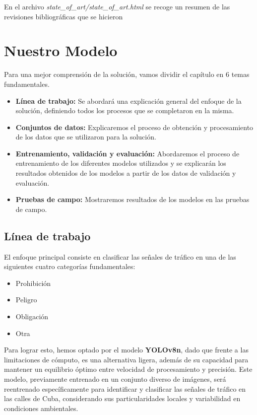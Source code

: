 \documentclass{article}
\begin{document}
\begin{tcolorbox}
En el archivo \textit{state\_of\_art/state\_of\_art.html} se recoge un resumen de las revisiones bibliográficas que se hicieron
\end{tcolorbox}



\section{Nuestro Modelo}
Para una mejor comprensión de la solución, vamos dividir el capítulo en 6 temas fundamentales.\\
\begin{itemize}
\item{\textbf{Línea de trabajo:} Se abordará una explicación general del enfoque de la solución, definiendo todos los procesos que se completaron en la misma.}
\item{\textbf{Conjuntos de datos:} Explicaremos el proceso de obtención y procesamiento de los datos que se utilizaron para la solución.}
\item{\textbf{Entrenamiento, validación y evaluación:} Abordaremos el proceso de entrenamiento de los diferentes modelos utilizados y se explicarán los resultados obtenidos de los modelos a partir de los datos de validación y evaluación.}
\item{\textbf{Pruebas de campo:} Mostraremos resultados de los modelos en las pruebas de campo.}
\end{itemize}
\subsection{Línea de trabajo}
El enfoque principal consiste en clasificar las señales de tráfico en una de las siguientes cuatro categorías fundamentales: 
\begin{itemize}
\item{Prohibición}
\item{Peligro}
\item{Obligación}
\item{Otra}
\end{itemize}
Para lograr esto, hemos optado por el modelo \textbf{YOLOv8n}, dado que frente a las limitaciones de cómputo, es una alternativa ligera, además de su capacidad para mantener un equilibrio óptimo entre velocidad de procesamiento y precisión. Este modelo, previamente entrenado en un conjunto diverso de imágenes, será reentrenado específicamente para identificar y clasificar las señales de tráfico en las calles de Cuba, considerando sus particularidades locales y variabilidad en condiciones ambientales.
\end{document}
